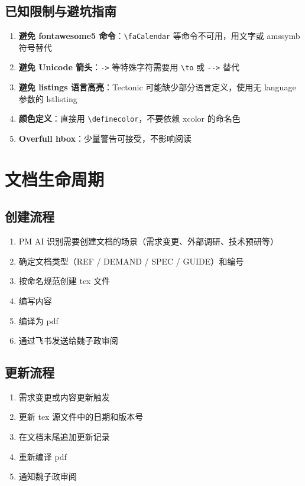 \documentclass[11pt,a4paper]{article}
\begin{document}
\subsection{已知限制与避坑指南}

\begin{enumerate}
  \item \textbf{避免 fontawesome5 命令}：\texttt{\textbackslash faCalendar} 等命令不可用，用文字或 amssymb 符号替代
  \item \textbf{避免 Unicode 箭头}：\texttt{->} 等特殊字符需要用 \texttt{\textbackslash to} 或 \texttt{-{}->{}} 替代
  \item \textbf{避免 listings 语言高亮}：Tectonic 可能缺少部分语言定义，使用无 language 参数的 lstlisting
  \item \textbf{颜色定义}：直接用 \texttt{\textbackslash definecolor}，不要依赖 xcolor 的命名色
  \item \textbf{Overfull hbox}：少量警告可接受，不影响阅读
\end{enumerate}

\section{文档生命周期}

\subsection{创建流程}

\begin{enumerate}
  \item PM AI 识别需要创建文档的场景（需求变更、外部调研、技术预研等）
  \item 确定文档类型（REF / DEMAND / SPEC / GUIDE）和编号
  \item 按命名规范创建 tex 文件
  \item 编写内容
  \item 编译为 pdf
  \item 通过飞书发送给魏子政审阅
\end{enumerate}

\subsection{更新流程}

\begin{enumerate}
  \item 需求变更或内容更新触发
  \item 更新 tex 源文件中的日期和版本号
  \item 在文档末尾追加更新记录
  \item 重新编译 pdf
  \item 通知魏子政审阅
\end{enumerate}
\end{document}
